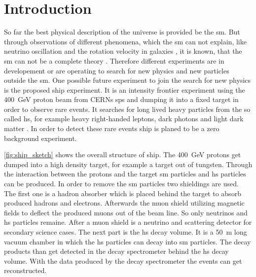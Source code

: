 \chapter{Introduction}



So far the best physical description of the universe is provided be the \ac{sm}.
But through observations of different phenomena, which the \ac{sm} can not explain, like neutrino oscillation \cite{} and the rotation velocity in galaxies \cite{}, it is known, that the \ac{sm} can not be a complete theory \cite{}.
Therefore different experiments are in developement or are operating to search for new physics and new particles outside the \ac{sm}.
One possible future experiment to join the search for new physics is the proposed \ac{ship} experiment.
It is an intensity frontier experiment using the \SI{400}{\giga\electronvolt} proton beam from CERNs \ac{sps} and dumping it into a fixed target in order to observe rare events.
It searches for long lived heavy particles from the so called \ac{hs}, for example heavy right-handed leptons, dark photons and light dark matter \cite{}.
In order to detect these rare events \ac{ship} is planed to be a zero background experiment.

\autoref{fig:ship_sketch} shows the overall structure of \ac{ship}.
The \SI{400}{\giga\electronvolt} protons get dumped into a high density target, for example a target out of tungsten.
Through the interaction between the protons and the target \ac{sm} particles and \ac{hs} particles can be produced.
In order to remove the \ac{sm} particles two shieldings are used.
The first one is a hadron absorber which is placed behind the target to absorb produced hadrons and electrons.
Afterwards the muon shield utilizing magnetic fields to deflect the produced muons out of the beam line.
So only neutrinos and \ac{hs} particles remaine.
After a muon shield is a neutrino and scattering detector for secondary science cases.
The next part is the \ac{hs} decay volume.
It is a \SI{50}{\meter} long vacuum chamber in which the \ac{hs} particles can decay into \ac{sm} particles.
The decay products than get detected in the decay spectrometer behind the \ac{hs} decay volume.
With the data produced by the decay spectrometer the events can get reconstructed.

